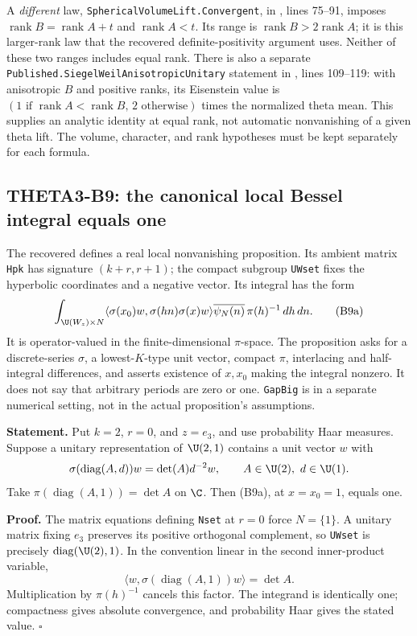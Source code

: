 \documentclass[11pt]{article}
\theoremstyle{definition}\newtheorem{definition}[theorem]{Definition}\newtheorem{remark}[theorem]{Remark}
\begin{document}
A \emph{different} law, \nolinkurl{SphericalVolumeLift.Convergent}, in , lines 75--91, imposes $\operatorname{rank}B=\operatorname{rank}A+t$ and $\operatorname{rank}A<t$. Its range is $\operatorname{rank}B>2\operatorname{rank}A$; it is this larger-rank law that the recovered definite-positivity argument uses. Neither of these two ranges includes equal rank. There is also a separate \nolinkurl{Published.SiegelWeilAnisotropicUnitary} statement in , lines 109--119: with anisotropic $B$ and positive ranks, its Eisenstein value is $(1\text{ if }\operatorname{rank}A<\operatorname{rank}B,\,2\text{ otherwise})$ times the normalized theta mean. This supplies an analytic identity at equal rank, not automatic nonvanishing of a given theta lift. The volume, character, and rank hypotheses must be kept separately for each formula.

\subsection{THETA3-B9: the canonical local Bessel integral equals one}\label{B9}

The recovered  defines a real local nonvanishing proposition. Its ambient matrix \texttt{Hpk} has signature $(k+r,r+1)$; the compact subgroup \texttt{UWset} fixes the hyperbolic coordinates and a negative vector. Its integral has the form
\[
 \int_{\U(W_z)\times N}
 \langle\sigma(x_0)w,\sigma(hn)\sigma(x)w\rangle
       \overline{\psi_N(n)}\,\pi(h)^{-1}\,dh\,dn.
 \tag{B9a}
\]
It is operator-valued in the finite-dimensional $\pi$-space. The proposition asks for a discrete-series $\sigma$, a lowest-$K$-type unit vector, compact $\pi$, interlacing and half-integral differences, and asserts existence of $x,x_0$ making the integral nonzero. It does not say that arbitrary periods are zero or one. \texttt{GapBig} is in a separate numerical setting, not in the actual proposition's assumptions.

\textbf{Statement.} Put $k=2$, $r=0$, and $z=e_3$, and use probability Haar measures. Suppose a unitary representation of $\U(2,1)$ contains a unit vector $w$ with
\[
 \sigma(\operatorname{diag}(A,d))w=\det(A)d^{-2}w,
 \qquad A\in\U(2),\ d\in\U(1).
\]
Take $\pi(\operatorname{diag}(A,1))=\det A$ on $\C$. Then (B9a), at $x=x_0=1$, equals one.

\textbf{Proof.} The matrix equations defining \texttt{Nset} at $r=0$ force $N=\{1\}$. A unitary matrix fixing $e_3$ preserves its positive orthogonal complement, so \texttt{UWset} is precisely $\operatorname{diag}(\U(2),1)$. In the convention linear in the second inner-product variable,
\[
 \langle w,\sigma(\operatorname{diag}(A,1))w\rangle=\det A.
\]
Multiplication by $\pi(h)^{-1}$ cancels this factor. The integrand is identically one; compactness gives absolute convergence, and probability Haar gives the stated value. \hfill$\square$
\end{document}
